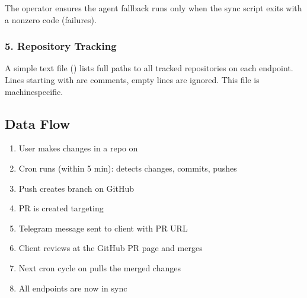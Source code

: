 \documentclass[letterpaper,10pt,openany,oneside,english]{sphinxmanual}
\begin{document}
\sphinxAtStartPar
{}

\sphinxAtStartPar
The \sphinxcode{\sphinxupquote{||}} operator ensures the agent fallback runs only when the sync script
exits with a non\sphinxhyphen{}zero code (failures).


\subsubsection{5. Repository Tracking}
\label{\detokenize{proposed_solution:repository-tracking}}
\sphinxAtStartPar
A simple text file () lists full paths to all tracked
repositories on each endpoint. Lines starting with \sphinxcode{\sphinxupquote{\#}} are comments, empty
lines are ignored. This file is machine\sphinxhyphen{}specific.


\subsection{Data Flow}
\label{\detokenize{proposed_solution:data-flow}}\begin{enumerate}
%
\item {} 
\sphinxAtStartPar
User makes changes in a repo on 

\item {} 
\sphinxAtStartPar
Cron runs (within 5 min): detects changes, commits, pushes

\item {} 
\sphinxAtStartPar
Push creates  branch on GitHub

\item {} 
\sphinxAtStartPar
PR is created targeting 

\item {} 
\sphinxAtStartPar
Telegram message sent to client with PR URL

\item {} 
\sphinxAtStartPar
Client reviews at the GitHub PR page and merges

\item {} 
\sphinxAtStartPar
Next cron cycle on  pulls the merged changes

\item {} 
\sphinxAtStartPar
All endpoints are now in sync

\end{enumerate}
\end{document}
